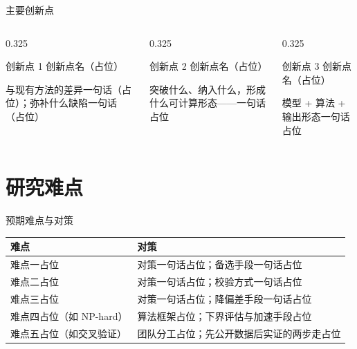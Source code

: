 \documentclass[aspectratio=169,11pt]{beamer}
\begin{document}
\begin{frame}{主要创新点}
  \footnotesize
  \begin{columns}[T]
    \begin{column}{0.325\textwidth}
      \begin{card}{创新点 1}
        \textcolor{primary}{创新点名（占位）}

        \vskip1mm
        与现有方法的差异一句话（占位）；弥补什么缺陷一句话（占位）
      \end{card}
    \end{column}
    \begin{column}{0.325\textwidth}
      \begin{card}{创新点 2}
        \textcolor{primary}{创新点名（占位）}

        \vskip1mm
        突破什么、纳入什么，形成什么可计算形态——一句话占位
      \end{card}
    \end{column}
    \begin{column}{0.325\textwidth}
      \begin{card}{创新点 3}
        \textcolor{primary}{创新点名（占位）}

        \vskip1mm
        模型 + 算法 + 输出形态一句话占位
      \end{card}
    \end{column}
  \end{columns}
\end{frame}

\section{研究难点}

\begin{frame}{预期难点与对策}
  \footnotesize
  \begin{tabular}{@{}p{}@{\quad}p{}@{}}
    \toprule
    \textcolor{primary}{\textbf{难点}} & \textcolor{primary}{\textbf{对策}} \\
    \midrule
    难点一占位 & 对策一句话占位；备选手段一句话占位 \\
    \addlinespace[0.7mm]
    难点二占位 & 对策一句话占位；校验方式一句话占位 \\
    \addlinespace[0.7mm]
    难点三占位 & 对策一句话占位；降偏差手段一句话占位 \\
    \addlinespace[0.7mm]
    难点四占位（如 NP-hard） & 算法框架占位；下界评估与加速手段占位 \\
    \addlinespace[1.2mm]
    难点五占位（如交叉验证） & 团队分工占位；先公开数据后实证的两步走占位 \\
    \bottomrule
  \end{tabular}
\end{frame}
\end{document}
